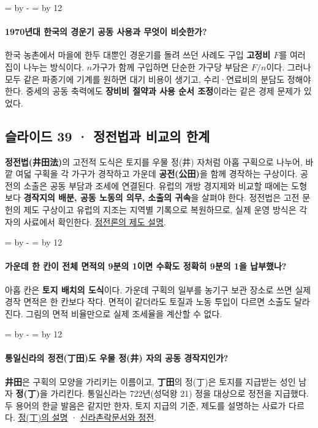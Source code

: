 \documentclass[10pt,a4paper]{article}
\newcommand{\ReserveQuestionSpace}{%
  \par\begingroup
  \dimen0=\pagegoal \advance\dimen0 by -\pagetotal
  \dimen2=\baselineskip \multiply\dimen2 by 12
  \ifdim\dimen0<\dimen2 \newpage\fi
  \endgroup}
\begin{document}
\ReserveQuestionSpace
\paragraph{1970년대 한국의 경운기 공동 사용과 무엇이 비슷한가?}

한국 농촌에서 마을에 한두 대뿐인 경운기를 돌려 쓰던 사례도 구입 \textbf{고정비 $F$}를 여러 집이 나누는 방식이다. $n$가구가 함께 구입하면 단순한 가구당 부담은 $F/n$이다. 그러나 모두 같은 파종기에 기계를 원하면 대기 비용이 생기고, 수리·연료비의 분담도 정해야 한다. 중세의 공동 축력에도 \textbf{장비비 절약과 사용 순서 조정}이라는 같은 경제 문제가 있었다.\par

\subsection{슬라이드 39 · 정전법과 비교의 한계}
\textbf{정전법(井田法)}의 고전적 도식은 토지를 우물 정(井) 자처럼 아홉 구획으로 나누어, 바깥 여덟 구획을 각 가구가 경작하고 가운데 \textbf{공전(公田)}을 함께 경작하는 구상이다. 공전의 소출은 공동 부담과 조세에 연결된다. 유럽의 개방 경지제와 비교할 때에는 도형보다 \textbf{경작지의 배분, 공동 노동의 의무, 소출의 귀속}을 살펴야 한다. 정전법은 고전 문헌의 제도 구상이고 유럽의 지조는 지역별 기록으로 복원하므로, 실제 운영 방식은 각자의 사료에서 확인한다. \href{https://encykorea.aks.ac.kr/Article/E0050859}{정전론의 제도 설명}.\par

\ReserveQuestionSpace
\paragraph{가운데 한 칸이 전체 면적의 9분의 1이면 수확도 정확히 9분의 1을 납부했나?}
아홉 칸은 \textbf{토지 배치의 도식}이다. 가운데 구획의 일부를 농기구 보관 장소로 쓰면 실제 경작 면적은 한 칸보다 작다. 면적이 같더라도 토질과 노동 투입이 다르면 소출도 달라진다. 그림의 면적 비율만으로 실제 조세율을 계산할 수 없다.\par

\ReserveQuestionSpace
\paragraph{통일신라의 정전(丁田)도 우물 정(井) 자의 공동 경작지인가?}
\textbf{井田}은 구획의 모양을 가리키는 이름이고, \textbf{丁田}의 정(丁)은 토지를 지급받는 성인 남자 \textbf{정(丁)}을 가리킨다. 통일신라는 722년(성덕왕 21) 정을 대상으로 정전을 지급했다. 두 용어의 한글 발음은 같지만 한자, 토지 지급의 기준, 제도를 설명하는 사료가 다르다. \href{https://encykorea.aks.ac.kr/Article/E0049889}{정(丁)의 설명} · \href{https://encykorea.aks.ac.kr/Article/E0032861}{신라촌락문서와 정전}.\par
\end{document}
